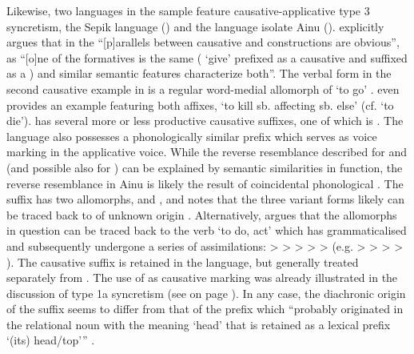 Likewise, two languages in the sample feature causative-applicative type 3 syncretism, the Sepik language  () and the language isolate Ainu (). \citet[254]{bruce:1979} explicitly argues that in  the “[p]arallels between causative and  constructions are obvious”, as “[o]ne of the formatives is the same ( ‘give’ prefixed as a causative and suffixed as a ) and similar semantic features characterize both”. The verbal form  in the second  causative example in  is a regular word-medial allomorph of  ‘to go’ \citep[250]{bruce:1979}. \citet[358]{bruce:1979} even provides an example featuring both affixes,  ‘to kill sb. affecting sb. else’ (cf.  ‘to die’).  has several more or less productive causative suffixes, one of which is . The language also possesses a phonologically similar prefix  which serves as voice marking in the applicative voice. While the reverse resemblance described for  and  (and possible also for ) can be explained by semantic similarities in function, the reverse resemblance in Ainu is likely the result of coincidental phonological . The suffix  has two allomorphs,  and , and \citet[475]{bugaeva:2015} notes that the three variant forms likely can be traced back to   of unknown origin \citep{vovin:1993}. Alternatively, \citet[15ff.]{nonno:2015} argues that the allomorphs in question can be traced back to the verb  ‘to do, act’ which has grammaticalised and subsequently undergone a series of assimilations:  >  >  >  >  >  (e.g.   >  >  >  > ). The causative suffix  is retained in the language, but generally treated separately from  \citep{bugaeva:2015}. The use of  as causative marking was already illustrated in the discussion of type 1a syncretism (see  on page \pageref{tab:ch3:type1a-examples-2}). In any case, the diachronic origin of the suffix  seems to differ from that of the prefix  which “probably originated in the relational noun with the meaning ‘head’ that is retained as a lexical prefix  ‘(its) head/top’” \citep[762]{bugaeva:2010}.

